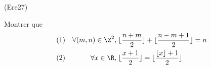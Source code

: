 \begin{tiny}(Ere27)\end{tiny}
Montrer que
\begin{align*}
  (1)& &\forall(m,n)\in \Z^2,& \; \lfloor \frac{n+m}{2}\rfloor + \lfloor \frac{n-m+1}{2}\rfloor = n \\
  (2)& &\forall x \in \R,& \; \lfloor \frac{x+1}{2}\rfloor = \lfloor \frac{\lfloor x\rfloor + 1}{2} \rfloor
\end{align*}
